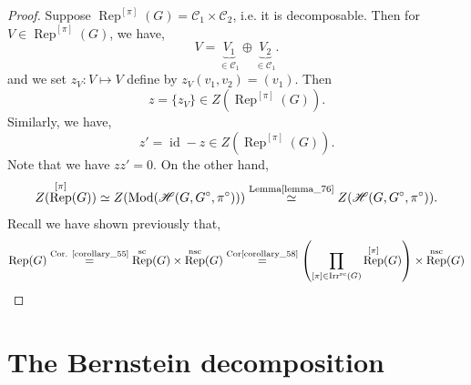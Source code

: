 \documentclass[8pt]{article}
\DeclareMathOperator{\Rep}{Rep}
\DeclareMathOperator{\Mod}{Mod}
\DeclareMathOperator{\id}{id}
\DeclareMathOperator{\supcus}{sc}
\DeclareMathOperator{\nsc}{nsc}
\DeclareMathOperator{\Irr}{Irr}
\newcommand{\hecke}[0]{\mathscr{H}}
\newcommand{\cat}{\mathscr{C}}
\begin{document}
\begin{proof}
Suppose $\Rep^{[\pi]}(G) = \cat_1\times\cat_2$, i.e. it is decomposable. Then for $V\in\Rep^{[\pi]}(G)$, we have,
\begin{equation*}
  V= \underbrace{V_1}_{\in\cat_1}\oplus \underbrace{V_2}_{\in\cat_1}. 
\end{equation*}
and we set $z_{V}:V\mapsto V$ define by $z_{V}(v_1,v_2) = (v_1)$. Then 
\begin{equation*}
  z = \{z_{V}\}\in Z(\Rep^{[\pi]}(G)).
\end{equation*}
Similarly, we have,
\begin{equation*}
  z'=\id-z\in  Z(\Rep^{[\pi]}(G)).
\end{equation*}
Note that we have $zz' = 0$. On the other hand, 
\begin{equation*}
  Z(\Rep^{[\pi]}(G)) \simeq Z(\Mod(\hecke(G,G^\circ,\pi^\circ)))\stackrel{\text{Lemma\ref{lemma_76}}}\simeq Z(\hecke(G,G^\circ,\pi^\circ)).
\end{equation*}
Recall we have shown previously that,
\begin{equation*}
  \Rep(G) \stackrel{\text{Cor. \ref{corollary_55}}}{=} \Rep^{\supcus}(G)\times\Rep^{\nsc}(G) \stackrel{\text{Cor\ref{corollary_58}}}{=}\left(\prod_{[\pi]\in\Irr^{\supcus}(G)}\Rep^{[\pi]}(G)\right)\times\Rep^{\nsc}(G)
\end{equation*}
\end{proof}

\section{The Bernstein decomposition}
\end{document}
